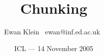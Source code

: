 % 
%
%
%
%
%
%
%
%
%
%
%
%
%
%
%
%
\title{Chunking}
\author{Ewan Klein \newline \mbox{ }ewan@inf.ed.ac.uk\mbox{ }}
\date{ICL --- 14 November 2005}



\newcommand{\Rule}{\rule{\textwidth}{1pt}}
\newcommand{\SqB}[1]{[#1]}

\newcommand{\bigdot}{\mbox{\begin{scriptsize}{\ensuremath{\bullet}}\end{scriptsize}}}

\newcommand{\chdot}{\bigdot}





\usepackage{color}
\usepackage{amsmath}
\usepackage{graphicx}
\usepackage{alltt}


\newcommand{\Hilite}[1]{\colorbox{yellow}{#1}}
\newcommand{\Shade}[1]{\colorbox{light}{#1}}

\newcommand{\Em}[1]{\textcolor{red}{#1}}
\newcommand{\Dim}[1]{\textcolor{gray}{#1}}

\setlength{\parskip}{0in}
\setlength{\parindent}{0in}



\usepackage{synttree}
\branchheight{5ex}




